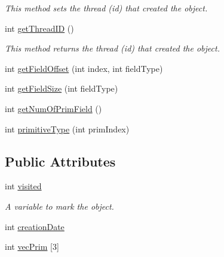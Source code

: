 \begin{DoxyCompactItemize}
\begin{DoxyCompactList}\small\item\em This method sets the thread (id) that created the object. \end{DoxyCompactList}\item 
\hypertarget{classtrace_gen_1_1_object_a4eb076a3252704fb6a6b1d940ea8c0a7}{}int \hyperlink{classtrace_gen_1_1_object_a4eb076a3252704fb6a6b1d940ea8c0a7}{get\+Thread\+I\+D} ()\label{classtrace_gen_1_1_object_a4eb076a3252704fb6a6b1d940ea8c0a7}

\begin{DoxyCompactList}\small\item\em This method returns the thread (id) that created the object. \end{DoxyCompactList}\item 
int \hyperlink{classtrace_gen_1_1_object_a6a2d496880c9a755b85409bfa7433c9f}{get\+Field\+Offset} (int index, int field\+Type)
\item 
int \hyperlink{classtrace_gen_1_1_object_a933d68e6c506875e3c7881c083686631}{get\+Field\+Size} (int field\+Type)
\item 
int \hyperlink{classtrace_gen_1_1_object_a5ec1d5b05f032a3be5ecc11a7e50a943}{get\+Num\+Of\+Prim\+Field} ()
\item 
int \hyperlink{classtrace_gen_1_1_object_a3ae743d0d6ec9436367e951ad931a4cf}{primitive\+Type} (int prim\+Index)
\end{DoxyCompactItemize}
\subsection*{Public Attributes}
\begin{DoxyCompactItemize}
\item 
\hypertarget{classtrace_gen_1_1_object_a7f40fef3564bbb35ff2fcc37af433827}{}int \hyperlink{classtrace_gen_1_1_object_a7f40fef3564bbb35ff2fcc37af433827}{visited}\label{classtrace_gen_1_1_object_a7f40fef3564bbb35ff2fcc37af433827}

\begin{DoxyCompactList}\small\item\em A variable to mark the object. \end{DoxyCompactList}\item 
int \hyperlink{classtrace_gen_1_1_object_a42033fc5eed812ce191520dc7db145f4}{creation\+Date}
\item 
int \hyperlink{classtrace_gen_1_1_object_a9a3ca83d495259399c1cab1342aa6a72}{vec\+Prim} \mbox{[}3\mbox{]}
\end{DoxyCompactItemize}


